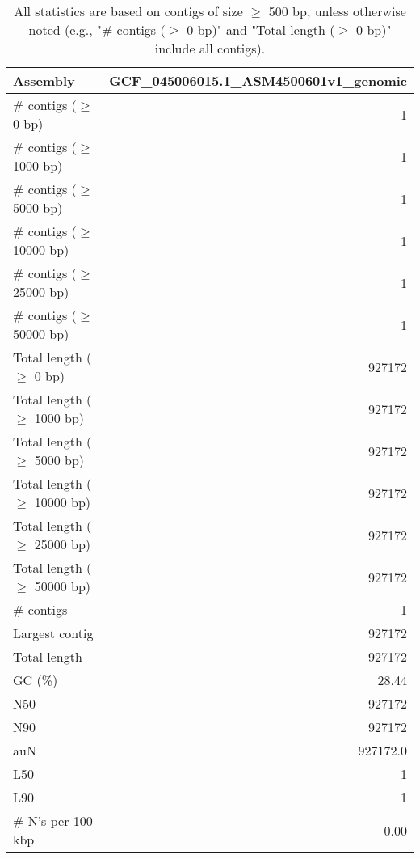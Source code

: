 \documentclass[12pt,a4paper]{article}
\begin{document}
\begin{table}[ht]
\begin{center}
\caption{All statistics are based on contigs of size $\geq$ 500 bp, unless otherwise noted (e.g., "\# contigs ($\geq$ 0 bp)" and "Total length ($\geq$ 0 bp)" include all contigs).}
\begin{tabular}{|l*{1}{|r}|}
\hline
Assembly & GCF\_045006015.1\_ASM4500601v1\_genomic \\ \hline
\# contigs ($\geq$ 0 bp) & 1 \\ \hline
\# contigs ($\geq$ 1000 bp) & 1 \\ \hline
\# contigs ($\geq$ 5000 bp) & 1 \\ \hline
\# contigs ($\geq$ 10000 bp) & 1 \\ \hline
\# contigs ($\geq$ 25000 bp) & 1 \\ \hline
\# contigs ($\geq$ 50000 bp) & 1 \\ \hline
Total length ($\geq$ 0 bp) & 927172 \\ \hline
Total length ($\geq$ 1000 bp) & 927172 \\ \hline
Total length ($\geq$ 5000 bp) & 927172 \\ \hline
Total length ($\geq$ 10000 bp) & 927172 \\ \hline
Total length ($\geq$ 25000 bp) & 927172 \\ \hline
Total length ($\geq$ 50000 bp) & 927172 \\ \hline
\# contigs & 1 \\ \hline
Largest contig & 927172 \\ \hline
Total length & 927172 \\ \hline
GC (\%) & 28.44 \\ \hline
N50 & 927172 \\ \hline
N90 & 927172 \\ \hline
auN & 927172.0 \\ \hline
L50 & 1 \\ \hline
L90 & 1 \\ \hline
\# N's per 100 kbp & 0.00 \\ \hline
\end{tabular}
\end{center}
\end{table}
\end{document}
